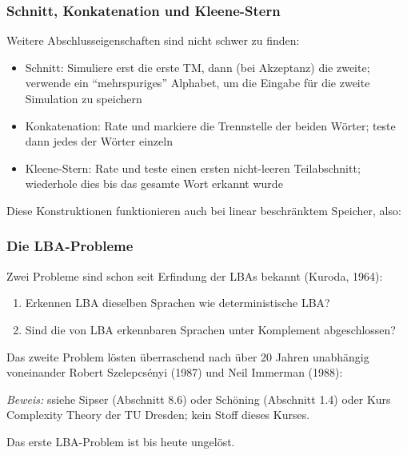 \documentclass[aspectratio=1610,onlymath]{beamer}
\begin{document}
\begin{frame}\frametitle{Schnitt, Konkatenation und Kleene-Stern}

Weitere Abschlusseigenschaften sind nicht schwer zu finden:

\begin{itemize}
\item \alert{Schnitt:} Simuliere erst die erste TM, dann (bei Akzeptanz) die zweite; verwende ein "`mehrspuriges"' Alphabet, um die Eingabe für die zweite Simulation zu speichern
\item \alert{Konkatenation:} Rate und markiere die Trennstelle der beiden Wörter; teste dann jedes der Wörter einzeln
\item \alert{Kleene-Stern:} Rate und teste einen ersten nicht-leeren Teilabschnitt; wiederhole dies bis das gesamte Wort erkannt wurde
\end{itemize}\pause

Diese Konstruktionen funktionieren auch bei linear beschränktem Speicher, also:\medskip


\end{frame}

\begin{frame}\frametitle{Die LBA-Probleme}

Zwei Probleme sind schon seit Erfindung der LBAs bekannt (Kuroda, 1964):
\begin{enumerate}[(1)]
\item Erkennen LBA dieselben Sprachen wie deterministische LBA?
\item Sind die von LBA erkennbaren Sprachen unter Komplement abgeschlossen?
\end{enumerate}\pause

Das zweite Problem lösten überraschend nach über 20 Jahren unabhängig voneinander Robert Szelepcsényi (1987) und Neil Immerman (1988):\medskip

\medskip

\emph{Beweis:} ssiehe Sipser (Abschnitt 8.6) oder Schöning (Abschnitt 1.4) oder Kurs \alert{Complexity Theory} der TU Dresden; kein Stoff dieses Kurses.
\medskip\pause

Das erste LBA-Problem ist bis heute ungelöst.

\end{frame}
\end{document}
